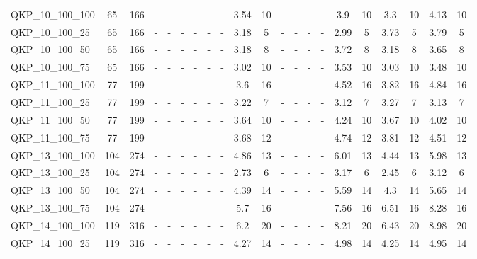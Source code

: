 \begin{sidewaystable}[!ht]
{\begin{tabular}{lcccccccccccccccccccc}
QKP\_10\_100\_100 & 65 & 166 &  - &  - &  - &  - &  - &  - & 3.54 & 10 &  - &  - &  - &  - & 3.9 & 10 &  \textcolor{blue2}{3.3} & 10 & 4.13 & 10 \\
QKP\_10\_100\_25 & 65 & 166 &  - &  - &  - &  - &  - &  - & 3.18 & 5 &  - &  - &  - &  - &  \textcolor{blue2}{2.99} & 5 & 3.73 & 5 & 3.79 & 5 \\
QKP\_10\_100\_50 & 65 & 166 &  - &  - &  - &  - &  - &  - &  \textcolor{blue2}{3.18} & 8 &  - &  - &  - &  - & 3.72 & 8 &  \textcolor{blue2}{3.18} & 8 & 3.65 & 8 \\
QKP\_10\_100\_75 & 65 & 166 &  - &  - &  - &  - &  - &  - &  \textcolor{blue2}{3.02} & 10 &  - &  - &  - &  - & 3.53 & 10 & 3.03 & 10 & 3.48 & 10 \\
QKP\_11\_100\_100 & 77 & 199 &  - &  - &  - &  - &  - &  - &  \textcolor{blue2}{3.6} & 16 &  - &  - &  - &  - & 4.52 & 16 & 3.82 & 16 & 4.84 & 16 \\
QKP\_11\_100\_25 & 77 & 199 &  - &  - &  - &  - &  - &  - & 3.22 & 7 &  - &  - &  - &  - &  \textcolor{blue2}{3.12} & 7 & 3.27 & 7 & 3.13 & 7 \\
QKP\_11\_100\_50 & 77 & 199 &  - &  - &  - &  - &  - &  - &  \textcolor{blue2}{3.64} & 10 &  - &  - &  - &  - & 4.24 & 10 & 3.67 & 10 & 4.02 & 10 \\
QKP\_11\_100\_75 & 77 & 199 &  - &  - &  - &  - &  - &  - &  \textcolor{blue2}{3.68} & 12 &  - &  - &  - &  - & 4.74 & 12 & 3.81 & 12 & 4.51 & 12 \\
QKP\_13\_100\_100 & 104 & 274 &  - &  - &  - &  - &  - &  - & 4.86 & 13 &  - &  - &  - &  - & 6.01 & 13 &  \textcolor{blue2}{4.44} & 13 & 5.98 & 13 \\
QKP\_13\_100\_25 & 104 & 274 &  - &  - &  - &  - &  - &  - & 2.73 & 6 &  - &  - &  - &  - & 3.17 & 6 &  \textcolor{blue2}{2.45} & 6 & 3.12 & 6 \\
QKP\_13\_100\_50 & 104 & 274 &  - &  - &  - &  - &  - &  - & 4.39 & 14 &  - &  - &  - &  - & 5.59 & 14 &  \textcolor{blue2}{4.3} & 14 & 5.65 & 14 \\
QKP\_13\_100\_75 & 104 & 274 &  - &  - &  - &  - &  - &  - &  \textcolor{blue2}{5.7} & 16 &  - &  - &  - &  - & 7.56 & 16 & 6.51 & 16 & 8.28 & 16 \\
QKP\_14\_100\_100 & 119 & 316 &  - &  - &  - &  - &  - &  - &  \textcolor{blue2}{6.2} & 20 &  - &  - &  - &  - & 8.21 & 20 & 6.43 & 20 & 8.98 & 20 \\
QKP\_14\_100\_25 & 119 & 316 &  - &  - &  - &  - &  - &  - & 4.27 & 14 &  - &  - &  - &  - & 4.98 & 14 &  \textcolor{blue2}{4.25} & 14 & 4.95 & 14 \\

\end{tabular}}
\end{sidewaystable}
